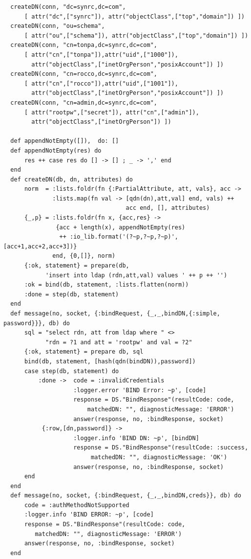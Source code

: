 \begin{lstlisting}
  createDN(conn, "dc=synrc,dc=com",
      [ attr("dc",["synrc"]), attr("objectClass",["top","domain"]) ])
  createDN(conn, "ou=schema",
      [ attr("ou",["schema"]), attr("objectClass",["top","domain"]) ])
  createDN(conn, "cn=tonpa,dc=synrc,dc=com",
      [ attr("cn",["tonpa"]),attr("uid",["1000"]),
        attr("objectClass",["inetOrgPerson","posixAccount"]) ])
  createDN(conn, "cn=rocco,dc=synrc,dc=com",
      [ attr("cn",["rocco"]),attr("uid",["1001"]),
        attr("objectClass",["inetOrgPerson","posixAccount"]) ])
  createDN(conn, "cn=admin,dc=synrc,dc=com",
      [ attr("rootpw",["secret"]), attr("cn",["admin"]),
        attr("objectClass",["inetOrgPerson"]) ])

  def appendNotEmpty([]),  do: []
  def appendNotEmpty(res) do
      res ++ case res do [] -> [] ; _ -> ',' end
  end
  def createDN(db, dn, attributes) do
      norm  = :lists.foldr(fn {:PartialAttribute, att, vals}, acc ->
              :lists.map(fn val -> [qdn(dn),att,val] end, vals) ++
                                   acc end, [], attributes)
      {_,p} = :lists.foldr(fn x, {acc,res} ->
               {acc + length(x), appendNotEmpty(res)
                ++ :io_lib.format('(?~p,?~p,?~p)', [acc+1,acc+2,acc+3])}
              end, {0,[]}, norm)
      {:ok, statement} = prepare(db,
            'insert into ldap (rdn,att,val) values ' ++ p ++ '')
      :ok = bind(db, statement, :lists.flatten(norm))
      :done = step(db, statement)
  end
  def message(no, socket, {:bindRequest, {_,_,bindDN,{:simple, password}}}, db) do
      sql = "select rdn, att from ldap where " <>
            "rdn = ?1 and att = 'rootpw' and val = ?2"
      {:ok, statement} = prepare db, sql
      bind(db, statement, [hash(qdn(bindDN)),password])
      case step(db, statement) do
          :done ->  code = :invalidCredentials
                    :logger.error 'BIND Error: ~p', [code]
                    response = DS."BindResponse"(resultCode: code,
                        matchedDN: "", diagnosticMessage: 'ERROR')
                    answer(response, no, :bindResponse, socket)
           {:row,[dn,password]} ->
                    :logger.info 'BIND DN: ~p', [bindDN]
                    response = DS."BindResponse"(resultCode: :success,
                         matchedDN: "", diagnosticMessage: 'OK')
                    answer(response, no, :bindResponse, socket)
      end
  end
  def message(no, socket, {:bindRequest, {_,_,bindDN,creds}}, db) do
      code = :authMethodNotSupported
      :logger.info 'BIND ERROR: ~p', [code]
      response = DS."BindResponse"(resultCode: code,
         matchedDN: "", diagnosticMessage: 'ERROR')
      answer(response, no, :bindResponse, socket)
  end
\end{lstlisting}

